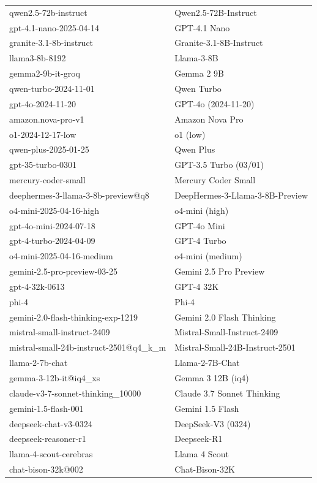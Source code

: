 \documentclass[11pt]{article}
\begin{document}
\begin{table}[htbp]
{\begin{tabular}{ll}
qwen2.5-72b-instruct & Qwen2.5-72B-Instruct \\
gpt-4.1-nano-2025-04-14 & GPT-4.1 Nano \\
granite-3.1-8b-instruct & Granite-3.1-8B-Instruct \\
llama3-8b-8192 & Llama-3-8B \\
gemma2-9b-it-groq & Gemma 2 9B \\
qwen-turbo-2024-11-01 & Qwen Turbo \\
gpt-4o-2024-11-20 & GPT-4o (2024-11-20) \\
amazon.nova-pro-v1 & Amazon Nova Pro \\
o1-2024-12-17-low & o1 (low) \\
qwen-plus-2025-01-25 & Qwen Plus \\
gpt-35-turbo-0301 & GPT-3.5 Turbo (03/01) \\
mercury-coder-small & Mercury Coder Small \\
deephermes-3-llama-3-8b-preview@q8 & DeepHermes-3-Llama-3-8B-Preview \\
o4-mini-2025-04-16-high & o4-mini (high) \\
gpt-4o-mini-2024-07-18 & GPT-4o Mini \\
gpt-4-turbo-2024-04-09 & GPT-4 Turbo \\
o4-mini-2025-04-16-medium & o4-mini (medium) \\
gemini-2.5-pro-preview-03-25 & Gemini 2.5 Pro Preview \\
gpt-4-32k-0613 & GPT-4 32K \\
phi-4 & Phi-4 \\
gemini-2.0-flash-thinking-exp-1219 & Gemini 2.0 Flash Thinking \\
mistral-small-instruct-2409 & Mistral-Small-Instruct-2409 \\
mistral-small-24b-instruct-2501@q4\_k\_m & Mistral-Small-24B-Instruct-2501 \\
llama-2-7b-chat & Llama-2-7B-Chat \\
gemma-3-12b-it@iq4\_xs & Gemma 3 12B (iq4) \\
claude-v3-7-sonnet-thinking\_10000 & Claude 3.7 Sonnet Thinking \\
gemini-1.5-flash-001 & Gemini 1.5 Flash \\
deepseek-chat-v3-0324 & DeepSeek-V3 (0324) \\
deepseek-reasoner-r1 & Deepseek-R1 \\
llama-4-scout-cerebras & Llama 4 Scout \\
chat-bison-32k@002 & Chat-Bison-32K \\

\end{tabular}}
\end{table}
\end{document}
